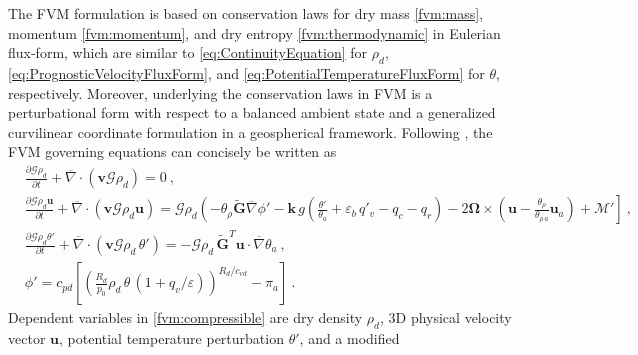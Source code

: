 \documentclass[gmd, manuscript]{copernicus}
\newcommand{\pdiff}[2]{\frac{\partial #1}{\partial #2}}
\begin{document}
The FVM formulation is based on conservation laws for dry mass \eqref{fvm:mass}, momentum \eqref{fvm:momentum}, 
and dry entropy \eqref{fvm:thermodynamic} in Eulerian flux-form,
which are similar to \eqref{eq:ContinuityEquation} for $\rho_d$, \eqref{eq:PrognosticVelocityFluxForm}, and 
\eqref{eq:PotentialTemperatureFluxForm} for $\theta$, respectively. Moreover, underlying the conservation laws 
in FVM is a perturbational form with respect to a balanced ambient state and a generalized curvilinear 
coordinate formulation in a geospherical framework. Following \cite{smolarkiewiczetalJCP2017}, the
FVM governing equations can concisely be written as
\begin{subequations} \label{fvm:compressible}
\begin{align}
 & \pdiff{\mathcal{G}\rho_d}{t} + \overline{\nabla} \cdot \left(\mathbf{v} \mathcal{G} \rho_d\right) = 0~,
\label{fvm:mass}  \\
& \pdiff{\mathcal{G} \rho_d \mathbf{u}}{t} + \overline{\nabla} \cdot \left(\mathbf{v} \mathcal{G} \rho_d \mathbf{u} \right) = 
\mathcal{G}\rho_d\left( - \theta_{\rho} \mathbf{\widetilde{G}} \overline{\nabla} \phi' 
- \mathbf{k}\,g \left(\frac{\theta'}{\theta_a}+\varepsilon_b\,q'_v - q_c - q_r \right)
- 2\mathbf{\Omega} \times \left( \mathbf{u} - \frac{\theta_{\rho}}{\theta_{\rho\,a}} \mathbf{u}_{a} \right) 
+ \mathcal{M}' \right]~,
\label{fvm:momentum} \\
& \pdiff{\mathcal{G}\rho_d \theta'}{t} + \overline{\nabla} \cdot \left(\mathbf{v}\mathcal{G}\rho_d\,\theta' \right) = 
- \mathcal{G}\rho_d\,\mathbf{\widetilde{G}}^{T}\mathbf{u} \cdot \overline{\nabla} \theta_{a} ~,
\label{fvm:thermodynamic} \\
& \phi' = c_{pd} \left[\left( \frac{R_{d}}{p_{0}} \rho_d\,\theta\,(1+q_v/\varepsilon) \right)^{R_{d}/c_{vd}} - \pi_{a} \right]~.
\label{fvm:gaslaw}
\end{align}
\end{subequations}
Dependent variables in \eqref{fvm:compressible} are dry density $\rho_d$, 3D
physical velocity vector $\mathbf{u}$, potential temperature perturbation $\theta'$, and a modified
\end{document}
